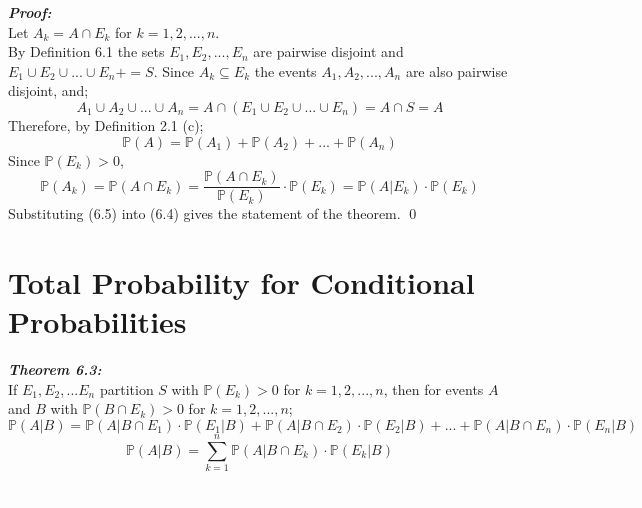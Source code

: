 \documentclass{report}
\newenvironment{cframed2}[1][PineGreen]
  {\begin{tcolorbox}[colframe=#1,colback=white]}
  {\end{tcolorbox}}
\newenvironment{cframedp}[1][Black]
  {\begin{tcolorbox}[colframe=#1,colback=white]}
  {\end{tcolorbox}}
\begin{document}
\begin{cframedp}
\textit{\textbf{Proof:}}\\
Let $A_k = A \cap E_k$ for $k = 1,2,...,n$.\\
By Definition 6.1 the sets $E_1, E_2,..., E_n$ are pairwise disjoint and $E_1 \cup E_2 \cup ... \cup E_n += S$. Since $A_k \subseteq E_k$ the events $A_1, A_2,...,A_n$ are also pairwise disjoint, and;
\begin{equation}
    A_1 \cup A_2 \cup ... \cup A_n = A \cap (E_1 \cup E_2 \cup ... \cup E_n ) = A \cap S = A
\end{equation}
Therefore, by Definition 2.1 (c);
\begin{equation}
    \mathbb{P}(A) = \mathbb{P}(A_1) + \mathbb{P}(A_2) + ... + \mathbb{P}(A_n)
\end{equation}
Since $\mathbb{P}(E_k) > 0$,
\begin{equation}
    \mathbb{P}(A_k) = \mathbb{P}(A \cap E_k) = \frac{\mathbb{P}(A \cap E_k)}{\mathbb{P}(E_k)} \cdot \mathbb{P}(E_k) = \mathbb{P}(A|E_k) \cdot \mathbb{P}(E_k)
\end{equation}
Substituting (6.5) into (6.4) gives the statement of the theorem.
\qed
\end{cframedp}

\section{Total Probability for Conditional Probabilities}

\begin{cframed2}
\textcolor{PineGreen}{\textit{\textbf{Theorem 6.3:}}\\
If $E_1, E_2, ... E_n$ partition $S$ with $\mathbb{P}(E_k) > 0$ for $k = 1, 2,...,n$, then for events $A$ and $B$ with $\mathbb{P}(B \cap E_k) > 0$ for $k = 1, 2,..., n$;
\begin{equation}
    \mathbb{P}(A|B) = \mathbb{P}(A|B \cap E_1) \cdot \mathbb{P}(E_1|B) + \mathbb{P}(A|B \cap E_2) \cdot \mathbb{P}(E_2|B) + ... + \mathbb{P}(A|B \cap E_n) \cdot \mathbb{P}(E_n|B)
\end{equation}
\begin{equation}
    \mathbb{P}(A|B) = \sum_{k=1}^{n} \mathbb{P}(A|B \cap E_k) \cdot \mathbb{P}(E_k|B)
\end{equation}
}
\end{cframed2}

\textcolor{White}{123}
\end{document}
